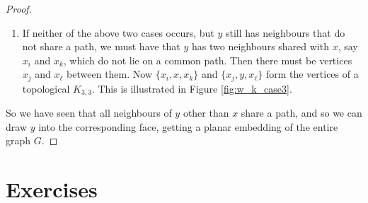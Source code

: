\documentclass[nobib]{tufte-handout}
\begin{document}
\begin{lemma}
\begin{proof}
\begin{enumerate}
\begin{marginfigure}
        \caption[]{A drawing of the third case in our case analysis.}
        \label{fig:w_k_case3}
      \end{marginfigure}
      \item If neither of the above two cases occurs, but $y$ still has neighbours that do not share a path, we must have that $y$ has two neighbours shared with $x$, say $x_i$ and $x_k$, which do not lie on a common path. Then there must be vertices $x_j$ and $x_\ell$ between them. Now $\{x_i, x, x_k\}$ and $\{x_j, y, x_\ell\}$ form the vertices of a topological $K_{3,3}$. This is illustrated in Figure \ref{fig:w_k_case3}.
    \end{enumerate}

    So we have seen that all neighbours of $y$ other than $x$ share a path, and so we can draw $y$ into the corresponding face, getting a planar embedding of the entire graph $G$.
  \end{proof}
\end{lemma}

\section{Exercises}


%
%
\end{document}
